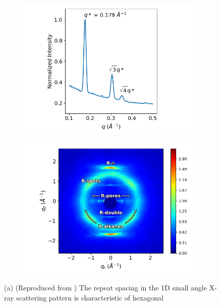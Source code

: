 \documentclass[journal=jpcbfk,manuscript=article]{achemso}
\begin{document}
  \begin{figure}[!htb]
        \centering
        \begin{subfigure}[t]{0.43\linewidth}
                \centering
                \includegraphics[width=\linewidth]{SAXS.png}
                \caption{}\label{fig:SAXS}
        \end{subfigure}
        \begin{subfigure}[t]{0.47\linewidth}
                \centering
                \includegraphics[width=\linewidth]{WAXS_annotated_words.png} 
                \caption{}\label{fig:WAXS}
        \end{subfigure}
	\caption{(a) (Reproduced from ) The repeat spacing
		in the 1D small angle X-ray scattering pattern is characteristic of hexagonal
}
\end{figure}
\end{document}
